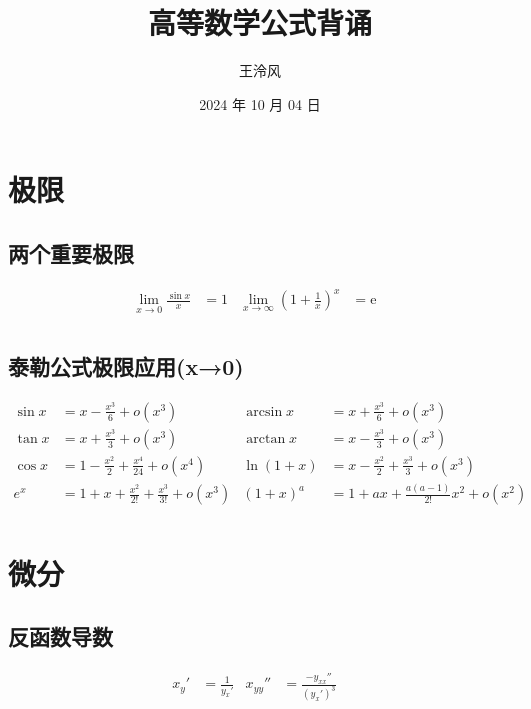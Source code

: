 ﻿\documentclass[a4paper,12pt,UTF8]{ctexart}
\begin{document}
    \title{高等数学公式背诵}
    \author{王泠风}
    \date{2024 年 10 月 04 日}
    \maketitle

    \section{极限}

    \subsection{两个重要极限}
    \begin{align*}
        \lim_{x\to 0}\frac{\sin x}{x}& = 1& \lim_{x\to\infty}\left(1+\frac{1}{x}\right)^x& = \mathrm{e}&\\
    \end{align*}
    
    \subsection{泰勒公式极限应用(x→0)}
    \begin{align*}
        \sin x& = x - \frac{x^{3}}{6} + o(x^{3})& \arcsin x& = x + \frac{x^{3}}{6} + o(x^{3})&\\
        \tan x& = x + \frac{x^{3}}{3} + o(x^{3})& \arctan x& = x - \frac{x^{3}}{3} + o(x^{3})&\\
        \cos x& = 1 - \frac{x^{2}}{2} + \frac{x^{4}}{24} + o(x^{4})& \ln (1+x)& = x - \frac{x^{2}}{2} + \frac{x^{3}}{3} + o(x^{3})&\\
        e^x& = 1 + x + \frac{x^{2}}{2!} + \frac{x^{3}}{3!} + o(x^{3})& (1+x)^{a}& = 1 + ax + \frac{a(a-1)}{2!}x^{2} + o(x^{2})&\\
    \end{align*}

    \section{微分}

    \subsection{反函数导数}
    \begin{align*}
        x_y'& = \frac{1}{y_x'}& x_{yy}''& = \frac{-y_{xx}''}{(y_x')^{3}}&\\
    \end{align*}
\end{document}
